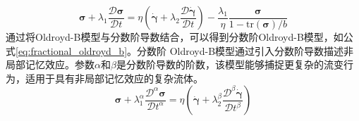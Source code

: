 \begin{equation}
	\boldsymbol{\sigma} + \lambda_1 \frac{\mathcal{D}\boldsymbol{\sigma}}{\mathcal{D}t} = \eta \left( \dot{\boldsymbol{\gamma}} + \lambda_2 \frac{\mathcal{D}\dot{\boldsymbol{\gamma}}}{\mathcal{D}t} \right) - \frac{\lambda_1}{\eta} \frac{\boldsymbol{\sigma}}{1 - \text{tr}(\boldsymbol{\sigma})/b} \label{eq:fene_p}
\end{equation}
通过将Oldroyd-B模型与分数阶导数结合，可以得到分数阶Oldroyd-B模型，如公式\eqref{eq:fractional_oldroyd_b}。分数阶 Oldroyd-B模型通过引入分数阶导数描述非局部记忆效应\cite{qi2007stokes}。参数$\alpha$和$\beta$是分数阶导数的阶数，该模型能够捕捉更复杂的流变行为，适用于具有非局部记忆效应的复杂流体。
\begin{equation}
	\boldsymbol{\sigma} + \lambda_1^\alpha \frac{\mathcal{D}^\alpha \boldsymbol{\sigma}}{\mathcal{D}t^\alpha} = \eta \left( \dot{\boldsymbol{\gamma}} + \lambda_2^\beta \frac{\mathcal{D}^\beta \dot{\boldsymbol{\gamma}}}{\mathcal{D}t^\beta} \right) \label{eq:fractional_oldroyd_b}
\end{equation}

